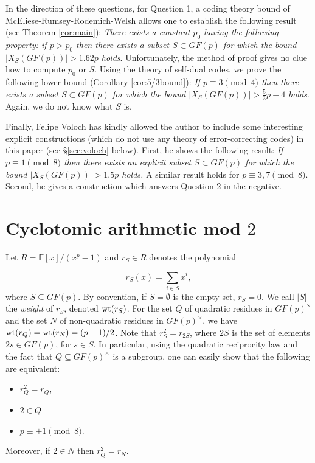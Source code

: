 \documentclass[submission%
]{dmtcs}
\def\fff{{\mathbb{F}}}
\def\wt{{\rm{wt}}}
\def\wt{{\rm{wt}}}
\begin{document}
In the direction of these questions, for
Question 1, a coding theory bound 
of McEliese-Rumsey-Rodemich-Welsh allows one to establish
the following result (see Theorem \ref{cor:main}):
{\it There exists a constant $p_0$ having the following
property: if $p>p_0$ then there exists a 
subset $S\subset GF(p)$ for which the bound $|X_S(GF(p))| > 1.62p$
holds}.
Unfortunately, the method of proof gives no clue how 
to compute $p_0$ or $S$.  Using the theory of self-dual codes,
we prove the following lower bound (Corollary \ref{cor:5/3bound}):
{\it If $p\equiv 3 \pmod 4$ then there exists a 
subset $S\subset GF(p)$ for which the bound $|X_S(GF(p))| > \frac{5}{3}p-4$
holds}. Again, we do not know what $S$ is. 

Finally, Felipe Voloch \cite{V2} has kindly allowed the 
author to include some interesting 
explicit constructions (which do not use any theory of
error-correcting codes) in this paper (see \S \ref{sec:voloch} below).
First, he shows the following result:
{\it If $p\equiv 1\pmod 8$ then there exists an explicit
subset $S\subset GF(p)$ for which the bound $|X_S(GF(p))| > 1.5p$
holds.} A similar result holds for $p\equiv 3,7\pmod 8$.
Second, he gives a construction which answers Question 2 in the negative. 

\section{Cyclotomic arithmetic mod $2$}
\label{sec:1}

Let $R = \fff [x]/(x^p - 1)$ and $r_S \in R$ denotes the
polynomial 

\[
r_S(x) =\sum_{i\in S} x^i,
\]
where $S\subseteq GF(p)$. By convention, if $S=\emptyset$ is the 
empty set, $r_S=0$. We call $|S|$ the {\it weight} of $r_S$, denoted 
$\wt(r_S)$.
For the set $Q$ of quadratic residues in $GF(p)^\times$ and the set 
$N$ of non-quadratic residues in $GF(p)^\times$, we have 
$\wt(r_Q)=\wt(r_N)=(p-1)/2$.
Note that $r_S^2=r_{2S}$, where $2S$ is the set of elements 
$2s\in GF(p)$, for $s\in S$. In particular, using the 
quadratic reciprocity law and the fact that $Q\subseteq GF(p)^\times$ is a 
subgroup, one can easily show that the following are equivalent:
\begin{itemize}
\item
$r_Q^2=r_Q$,
\item 
$2\in Q$ 
\item
$p\equiv \pm 1\pmod 8$.
\end{itemize}
Moreover, if $2\in N$ then $r_Q^2=r_N$.
\end{document}
